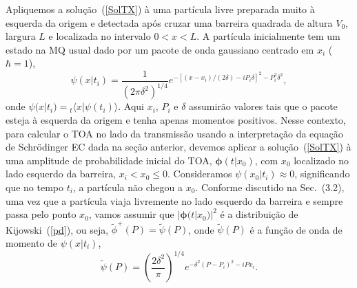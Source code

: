 Apliquemos a solução~(\ref{SolTX}) à uma partícula livre preparada muito à esquerda da origem e detectada após cruzar uma barreira quadrada de altura $V_0$, largura $L$ e localizada no intervalo $0 < x < L$. A partícula inicialmente tem um estado na MQ usual dado por um pacote de onda gaussiano centrado em $x_i$ ($\hbar=1$),
\begin{equation}\label{initialX}
\psi(x|t_i)=\frac{1}{(2\pi \delta^2)^{1/4}}e^{- \left[(x-x_i)/(2\delta)-iP_i\delta\right]^2- P_i^2\delta^2 },
\end{equation}
onde $\psi(x|t_i)={_t\langle}x|\psi(t_i)\rangle$. Aqui $x_i$, $P_i$ e $\delta$ assumirão valores tais que o pacote esteja à esquerda da origem e tenha apenas momentos positivos. Nesse contexto, para calcular o TOA no lado da transmissão usando a interpretação da equação de Schrödinger EC dada na seção anterior, devemos aplicar a solução~(\ref{SolTX}) à uma amplitude de probabilidade inicial do TOA, $\pmb{\phi}(t|x_0)$, com $x_0$ localizado no lado esquerdo da barreira, $x_i < x_0 \leq 0$. Consideramos $\psi(x_0|t_i)\approx 0$, significando que no tempo $t_i$, a partícula não chegou a $x_0$. Conforme discutido na Sec.~(3.2), uma vez que a partícula viaja livremente no lado esquerdo da barreira e sempre passa pelo ponto $x_0$, vamos assumir que $|\pmb{\phi}(t|x_0)|^2$ é a distribuição de Kijowski~(\ref{pd}), ou seja, ${\tilde \phi}^+(P)={\tilde \psi} (P)$, onde ${\tilde \psi}(P)$ é a função de onda de momento de $\psi(x|t_i)$,
\begin{equation}\label{initialXP}
{\tilde \psi(P)}=\left(\frac{2\delta^2}{\pi}\right)^{1/4}e^{-\delta^2 (P-P_i)^2 -iPx_i}.
\end{equation}






